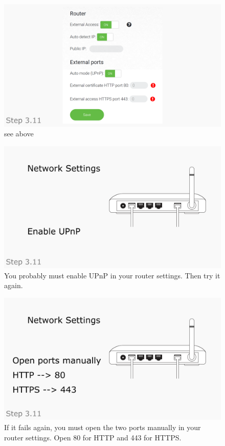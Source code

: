 \documentclass[a4paper,12pt]{article}
\begin{document}
\begin{figure}[htbp!]
	\centering
	\includegraphics[width=0.7\linewidth]{../frames/43.png}
	\caption{see above}
	\label{fig:30}
\end{figure}

\begin{figure}[htbp!]
	\centering
	\includegraphics[width=0.7\linewidth]{../frames/44.png}
	\caption{You probably must enable UPnP in your router settings. Then try it again.}
	\label{fig:31}
\end{figure}

\begin{figure}[htbp!]
	\centering
	\includegraphics[width=0.7\linewidth]{../frames/45.png}
	\caption{If it fails again, you must open the two ports manually in your router settings. Open 80 for HTTP and 443 for HTTPS.}
	\label{fig:32}
\end{figure}
\end{document}
